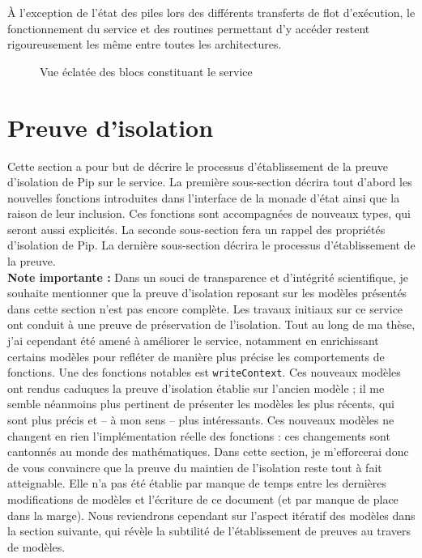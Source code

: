 		\newpage

		À l'exception de l'état des piles lors des différents transferts de flot d'exécution, le fonctionnement du service et des routines permettant d'y accéder restent rigoureusement les même entre toutes les architectures.

		\begin{figure}[!b]
			
			\caption{Vue éclatée des blocs constituant le service}
			\label{fig:callgraph}
		\end{figure}
		\newpage
	\section{Preuve d'isolation}
	\label{sec:service_proof}

		Cette section a pour but de décrire le processus d'établissement de la preuve d'isolation de Pip sur le service. La première sous-section décrira tout d'abord les nouvelles fonctions introduites dans l'interface de la monade d'état ainsi que la raison de leur inclusion. Ces fonctions sont accompagnées de nouveaux types, qui seront aussi explicités. La seconde sous-section fera un rappel des propriétés d'isolation de Pip. La dernière sous-section décrira le processus d'établissement de la preuve.\\

		\textbf{Note importante :} Dans un souci de transparence et d'intégrité scientifique, je souhaite mentionner que la preuve d'isolation reposant sur les modèles présentés dans cette section n'est pas encore complète. Les travaux initiaux sur ce service ont conduit à une preuve de préservation de l'isolation. Tout au long de ma thèse, j'ai cependant été amené à améliorer le service, notamment en enrichissant certains modèles pour refléter de manière plus précise les comportements de fonctions. Une des fonctions notables est \texttt{writeContext}. Ces nouveaux modèles ont rendus caduques la preuve d'isolation établie sur l'ancien modèle ; il me semble néanmoins plus pertinent de présenter les modèles les plus récents, qui sont plus précis et -- à mon sens -- plus intéressants. Ces nouveaux modèles ne changent en rien l'implémentation réelle des fonctions : ces changements sont cantonnés au monde des mathématiques. Dans cette section, je m'efforcerai donc de vous convaincre que la preuve du maintien de l'isolation reste tout à fait atteignable. Elle n'a pas été établie par manque de temps entre les dernières modifications de modèles et l'écriture de ce document (et par manque de place dans la marge). Nous reviendrons cependant sur l'aspect itératif des modèles dans la section suivante, qui révèle la subtilité de l'établissement de preuves au travers de modèles.

